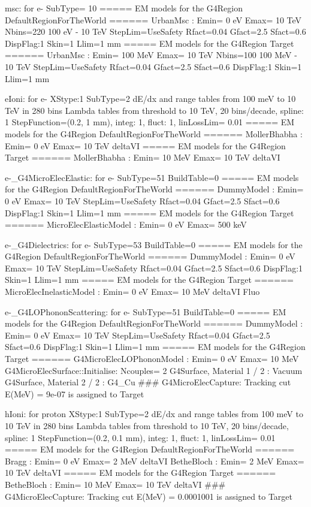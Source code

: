 msc:  for e-  SubType= 10
      ===== EM models for the G4Region  DefaultRegionForTheWorld ======
            UrbanMsc : Emin=    0 eV  Emax=   10 TeV Nbins=220 100 eV  -  10 TeV
          StepLim=UseSafety Rfact=0.04 Gfact=2.5 Sfact=0.6 DispFlag:1 Skin=1 Llim=1 mm
      ===== EM models for the G4Region  Target ======
            UrbanMsc : Emin=  100 MeV Emax=   10 TeV Nbins=100 100 MeV -  10 TeV
          StepLim=UseSafety Rfact=0.04 Gfact=2.5 Sfact=0.6 DispFlag:1 Skin=1 Llim=1 mm

eIoni:  for e-  XStype:1  SubType=2
      dE/dx and range tables from 100 meV to 10 TeV in 280 bins
      Lambda tables from threshold to 10 TeV, 20 bins/decade, spline: 1
      StepFunction=(0.2, 1 mm), integ: 1, fluct: 1, linLossLim= 0.01
      ===== EM models for the G4Region  DefaultRegionForTheWorld ======
        MollerBhabha : Emin=    0 eV  Emax=   10 TeV  deltaVI
      ===== EM models for the G4Region  Target ======
        MollerBhabha : Emin=   10 MeV Emax=   10 TeV  deltaVI

e-_G4MicroElecElastic:  for e- SubType=51 BuildTable=0
      ===== EM models for the G4Region  DefaultRegionForTheWorld ======
          DummyModel : Emin=    0 eV  Emax=   10 TeV
          StepLim=UseSafety Rfact=0.04 Gfact=2.5 Sfact=0.6 DispFlag:1 Skin=1 Llim=1 mm
      ===== EM models for the G4Region  Target ======
MicroElecElasticModel : Emin=    0 eV  Emax=  500 keV

e-_G4Dielectrics:  for e- SubType=53 BuildTable=0
      ===== EM models for the G4Region  DefaultRegionForTheWorld ======
          DummyModel : Emin=    0 eV  Emax=   10 TeV
          StepLim=UseSafety Rfact=0.04 Gfact=2.5 Sfact=0.6 DispFlag:1 Skin=1 Llim=1 mm
      ===== EM models for the G4Region  Target ======
MicroElecInelasticModel : Emin=    0 eV  Emax=   10 MeV  deltaVI Fluo

e-_G4LOPhononScattering:  for e- SubType=51 BuildTable=0
      ===== EM models for the G4Region  DefaultRegionForTheWorld ======
          DummyModel : Emin=    0 eV  Emax=   10 TeV
          StepLim=UseSafety Rfact=0.04 Gfact=2.5 Sfact=0.6 DispFlag:1 Skin=1 Llim=1 mm
      ===== EM models for the G4Region  Target ======
G4MicroElecLOPhononModel : Emin=    0 eV  Emax=   10 MeV
G4MicroElecSurface::Initialise: Ncouples= 2
G4Surface, Material 1 / 2 : Vacuum
G4Surface, Material 2 / 2 : G4_Cu
### G4MicroElecCapture: Tracking cut E(MeV) = 9e-07 is assigned to Target

hIoni:  for proton  XStype:1  SubType=2
      dE/dx and range tables from 100 meV to 10 TeV in 280 bins
      Lambda tables from threshold to 10 TeV, 20 bins/decade, spline: 1
      StepFunction=(0.2, 0.1 mm), integ: 1, fluct: 1, linLossLim= 0.01
      ===== EM models for the G4Region  DefaultRegionForTheWorld ======
               Bragg : Emin=    0 eV  Emax=    2 MeV  deltaVI
          BetheBloch : Emin=    2 MeV Emax=   10 TeV  deltaVI
      ===== EM models for the G4Region  Target ======
          BetheBloch : Emin=   10 MeV Emax=   10 TeV  deltaVI
### G4MicroElecCapture: Tracking cut E(MeV) = 0.0001001 is assigned to Target

